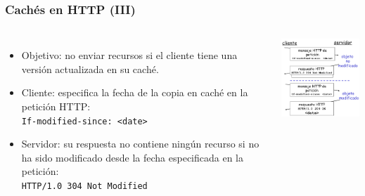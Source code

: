 \documentclass[hyperref={pdfpagelabels=true},ucs]{beamer}
\begin{document}
\begin{frame}[fragile]
\frametitle{Cachés en HTTP (III)}

\begin{columns}[c]

\column{60mm}
\begin{itemize}
\item Objetivo: no enviar recursos si el cliente tiene una versión
  actualizada en su caché.

\item Cliente: especifica la fecha de la copia en caché en la petición HTTP:\\
\Verb|If-modified-since: <date>|

\item Servidor: su respuesta no contiene ningún recurso si no ha sido
  modificado desde la fecha especificada en la petición:\\
\Verb|HTTP/1.0 304 Not Modified|
\end{itemize}

\column{60mm}
\begin{center}
\includegraphics[width=60mm]{figs/5-p35}
\end{center}

\end{columns}

\end{frame}





\end{document}
